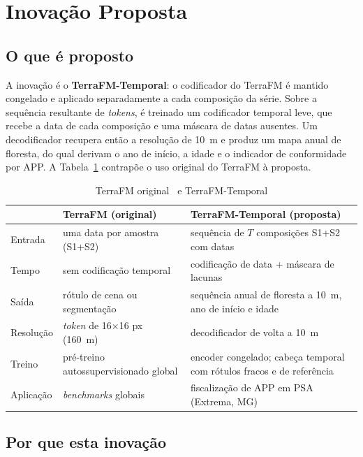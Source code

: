 \documentclass[conference]{IEEEtran}
\begin{document}
\section{Inovação Proposta}\label{sec:inovacao}

\subsection{O que é proposto}

A inovação é o \textbf{TerraFM-Temporal}: o codificador do TerraFM é mantido congelado e aplicado separadamente a cada composição da série. Sobre a sequência resultante de \textit{tokens}, é treinado um codificador temporal leve, que recebe a data de cada composição e uma máscara de datas ausentes. Um decodificador recupera então a resolução de 10~m e produz um mapa anual de floresta, do qual derivam o ano de início, a idade e o indicador de conformidade por APP. A Tabela~\ref{tab:comparacao} contrapõe o uso original do TerraFM à proposta.


\begin{table}[htbp]
\caption{TerraFM original~\citep{danish2026terrafm} e TerraFM-Temporal}
\begin{center}
\footnotesize
\begin{tabular}{|p{1.55cm}|p{2.85cm}|p{2.85cm}|}
\hline
 & \textbf{TerraFM (original)} & \textbf{TerraFM-Temporal (proposta)} \\
\hline
Entrada & uma data por amostra (S1+S2) & sequência de $T$ composições S1+S2 com datas \\
Tempo & sem codificação temporal & codificação de data + máscara de lacunas \\
Saída & rótulo de cena ou segmentação & sequência anual de floresta a 10~m, ano de início e idade \\
Resolução & \textit{token} de 16$\times$16 px (160~m) & decodificador de volta a 10~m \\
Treino & pré-treino autossupervisionado global & encoder congelado; cabeça temporal com rótulos fracos e de referência \\
Aplicação & \textit{benchmarks} globais & fiscalização de APP em PSA (Extrema, MG) \\
\hline
\end{tabular}
\label{tab:comparacao}
\end{center}
\end{table}

\subsection{Por que esta inovação}
\end{document}
